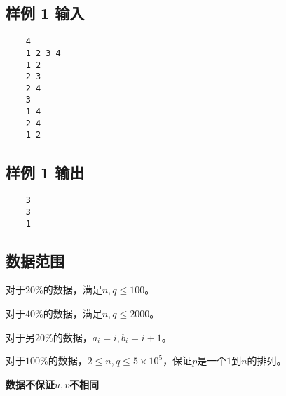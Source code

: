 \documentclass[12pt]{article}
\begin{document}
\subsection{样例 1 输入}

\begin{lstlisting}
    4
    1 2 3 4
    1 2
    2 3
    2 4
    3
    1 4
    2 4
    1 2
\end{lstlisting}

\subsection{样例 1 输出}

\begin{lstlisting}
    3
    3
    1
\end{lstlisting}

\subsection{数据范围}

对于$20\%$的数据，满足$n, q\leq 100$。\par
对于$40\%$的数据，满足$n, q\leq 2000$。\par
对于另$20\%$的数据，$a_i = i, b_i = i + 1$。\par
对于$100\%$的数据，$2\leq n, q\leq 5\times 10^5$，保证$p$是一个$1$到$n$的排列。\par
\textbf{数据不保证$u, v$不相同}
\end{document}
